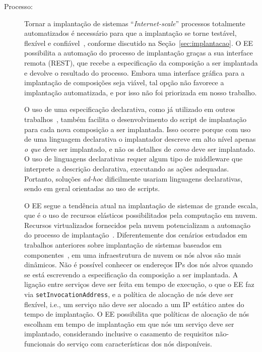 \begin{description}

\item [Processo:]

Tornar a implantação de sistemas ``\emph{Internet-scale}'' processos totalmente automatizados
é necessário para que a implantação se torne testável, flexível e confiável~\cite{Hamilton2007InternetScale},
conforme discutido na Seção~\ref{sec:implantacao}.
O EE possibilita a automação do processo de implantação
graças a sua interface remota (REST), que recebe a especificação
da composição a ser implantada e devolve o resultado do processo.
Embora uma interface gráfica para a implantação de composições seja viável,
tal opção não favorece a implantação automatizada,
e por isso não foi priorizada em nosso trabalho.

O uso de uma especificação declarativa,
como já utilizado em outros trabalhos~\cite{Balter1998Olan,Magee1996Dynamic},
também facilita o desenvolvimento do script de implantação
para cada nova composição a ser implantada.
Isso ocorre porque com uso de uma linguagem declarativa o implantador descreve em alto nível apenas
\emph{o que} deve ser implantado, e não os detalhes de \emph{como} deve ser implantado.
O uso de linguagens declarativas requer algum tipo de middleware que interprete
a descrição declarativa, executando as ações adequadas.
Portanto, soluções \emph{ad-hoc} dificilmente usariam linguagens declarativas,
sendo em geral orientadas ao uso de scripts.

O EE segue a tendência atual na implantação de sistemas de grande escala, que é o uso
de recursos elásticos possibilitados pela computação em nuvem.
Recursos virtualizados fornecidos pela nuvem potencializam
a automação do processo de implantação~\cite{Humble2011Continuous}.
Diferentemente dos cenários estudados em trabalhos anteriores sobre
implantação de sistemas baseados em componentes~\cite{Balter1998Olan,Magee1996Dynamic},
em uma infraestrutura de nuvem os nós alvos são mais dinâmicos. Não é possível conhecer os endereços IPs
dos nós alvos quando se está escrevendo a especificação da composição a ser implantada.
A ligação entre serviços deve ser feita em tempo de execução, o que o EE faz via \texttt{setInvocationAddress},
e a política de alocação de nós deve ser flexível, i.e.,
um serviço não deve ser alocado a um IP estático antes do tempo de implantação.
O EE possibilita que políticas de alocação de nós
escolham em tempo de implantação em que nós um serviço deve ser implantado,
considerando inclusive o casamento de requisitos não-funcionais do serviço
com características dos nós disponíveis.


\end{description}
